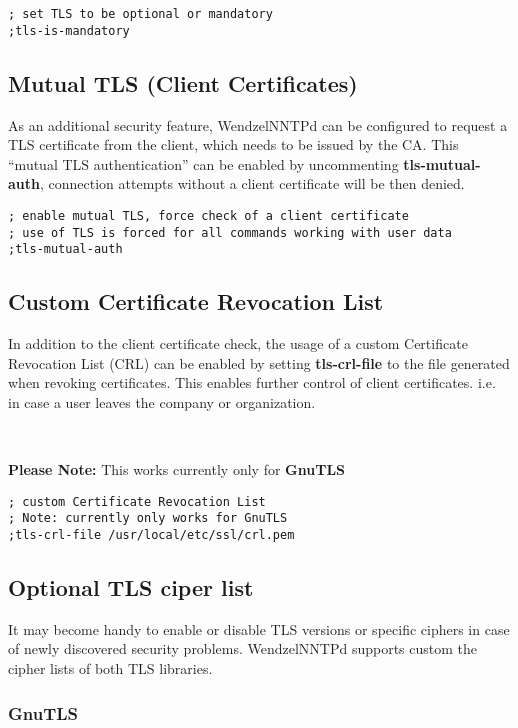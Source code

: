 \begin{verbatim}
; set TLS to be optional or mandatory
;tls-is-mandatory
\end{verbatim}

\subsection{Mutual TLS (Client Certificates)}

As an additional security feature, WendzelNNTPd can be configured to request a TLS certificate from the client, which needs to be issued by the CA. This ``mutual TLS authentication'' can be enabled by uncommenting \textbf{tls-mutual-auth}, connection attempts without a client certificate will be then denied.

\begin{verbatim}
; enable mutual TLS, force check of a client certificate
; use of TLS is forced for all commands working with user data
;tls-mutual-auth
\end{verbatim}

\subsection{Custom Certificate Revocation List}

In addition to the client certificate check, the usage of a custom Certificate Revocation List (CRL) can be enabled by setting \textbf{tls-crl-file} to the file generated when revoking certificates. This enables further control of client certificates. i.e. in case a user leaves the company or organization.

~

\textbf{Please Note:} This works currently only for \textbf{GnuTLS}

\begin{verbatim}
; custom Certificate Revocation List
; Note: currently only works for GnuTLS
;tls-crl-file /usr/local/etc/ssl/crl.pem
\end{verbatim}

\subsection{Optional TLS ciper list}

It may become handy to enable or disable TLS versions or specific ciphers in case of newly discovered security problems. WendzelNNTPd supports custom the cipher lists of both TLS libraries.

\subsubsection{GnuTLS}

